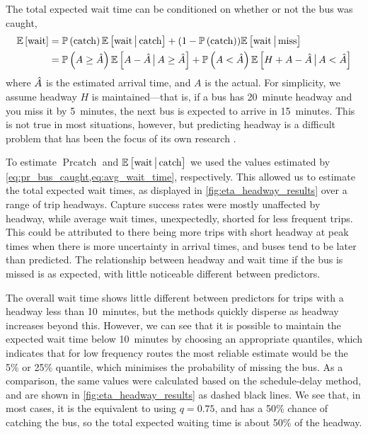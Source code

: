 The total expected wait time can be conditioned on whether or not the bus was caught,
\begin{equation}
\label{eq:eta_wait_conditional}
\begin{split}
\mathbb{E}\left[\text{wait}\right] &=
  \mathbb{P}\left(\text{catch}\right) \mathbb{E}\left[\text{wait}\,\big|\,{}\text{catch}\right] +
  (1 - \mathbb{P}\left(\text{catch}\right)) \mathbb{E}\left[\text{wait}\,\big|\,{}\text{miss}\right] \\
  &= \mathbb{P}\left(A \geq \hat{A}\right) \mathbb{E}\left[A - \hat{A} \,\big|\,{} A \geq \hat{A}\right] +
  \mathbb{P}\left(A < \hat{A}\right)\mathbb{E}\left[H + A - \hat{A} \,\big|\,{} A < \hat{A}\right]
\end{split}
\end{equation}
where $\hat{A}$ is the estimated arrival time, and $A$ is the actual. For simplicity, we assume headway $H$ is maintained---that is, if a bus has 20~minute headway and you miss it by 5~minutes, the next bus is expected to arrive in 15~minutes. This is not true in most situations, however, but predicting headway is a difficult problem that has been the focus of its own research \citep{Hans_2015,cn}.


To estimate $\Pr{\text{catch}}$ and $\mathbb{E}\left[\text{wait}\,\big|\,{}\text{catch}\right]$ we used the values estimated by \cref{eq:pr_bus_caught,eq:avg_wait_time}, respectively. This allowed us to estimate the total expected wait times, as displayed in \cref{fig:eta_headway_results} over a range of trip headways. Capture success rates were mostly unaffected by headway, while average wait times, unexpectedly, shorted for less frequent trips. This could be attributed to there being more trips with short headway at peak times when there is more uncertainty in arrival times, and buses tend to be later than predicted. The relationship between headway and wait time if the bus is missed is as expected, with little noticeable different between predictors.


The overall wait time shows little different between predictors for trips with a headway less than 10~minutes, but the methods quickly disperse as headway increases beyond this. However, we can see that it is possible to maintain the expected wait time below 10~minutes by choosing an appropriate quantiles, which indicates that for low frequency routes the most reliable estimate would be the 5\% or 25\% quantile, which minimises the probability of missing the bus. As a comparison, the same values were calculated based on the schedule-delay method, and are shown in \cref{fig:eta_headway_results} as dashed black lines. We see that, in most cases, it is the equivalent to using $q=0.75$, and has a 50\% chance of catching the bus, so the total expected waiting time is about 50\% of the headway.

